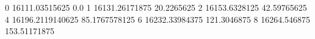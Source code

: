 0 16111.03515625 0.0
1 16131.26171875 20.2265625
2 16153.6328125 42.59765625
4 16196.2119140625 85.1767578125
6 16232.33984375 121.3046875
8 16264.546875 153.51171875
